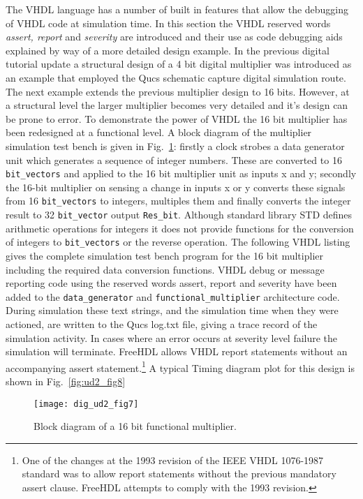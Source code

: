 The VHDL language has a number of built in features that allow the debugging of VHDL code at simulation time.  In this section the VHDL reserved words \textit{assert, report} and \textit{severity} are introduced and their use as code debugging aids explained by way of a more detailed design example. In the previous digital tutorial update a structural design of a 4 bit digital multiplier was introduced as an example that employed the Qucs schematic capture digital simulation route. The next example extends the previous multiplier design to 16 bits.  However, at a structural level the larger multiplier becomes very detailed and it's design can be prone to error.  To demonstrate the power of VHDL the 16 bit multiplier has been redesigned at a functional level.  A block diagram of the multiplier simulation test bench is given in Fig.~\ref{fig:ud2_fig7}: firstly a clock strobes a data generator unit which generates a sequence of integer numbers. These are converted to 16 \verb|bit_vectors| and applied to the 16 bit multiplier unit as inputs x and y; secondly the 16-bit multiplier on sensing a change in inputs x or y converts these signals from 16 \verb|bit_vectors| to integers, multiples them and finally converts the integer result to 32 \verb|bit_vector| output \verb|Res_bit|. Although standard library STD defines arithmetic operations for integers it does not provide functions for the conversion of integers to \verb|bit_vectors| or the reverse operation. The following VHDL listing gives the complete simulation test bench program for the 16 bit multiplier including the required data conversion functions. VHDL debug or message reporting code using the reserved words assert, report and severity have been added to the \verb|data_generator| and \verb|functional_multiplier| architecture code. During simulation these text strings, and the simulation time when they were actioned, are written to the Qucs log.txt file, giving a trace record of the simulation activity. In cases where an error occurs at severity level failure the simulation will terminate. FreeHDL allows VHDL report statements without an accompanying assert statement.\footnote{One of the changes at the 1993 revision of the IEEE VHDL 1076-1987 standard was to allow report statements without the previous mandatory assert clause.  FreeHDL attempts to comply with the 1993 revision.}  A typical Timing diagram plot for this design is shown in Fig.~\ref{fig:ud2_fig8} 

\FloatBarrier  
\begin{figure}[ht]   
  \centering 
  \texttt{[image: dig\_ud2\_fig7]}  
  \caption{Block diagram of a 16 bit functional multiplier.} 
  \label{fig:ud2_fig7} 
\end{figure} 


